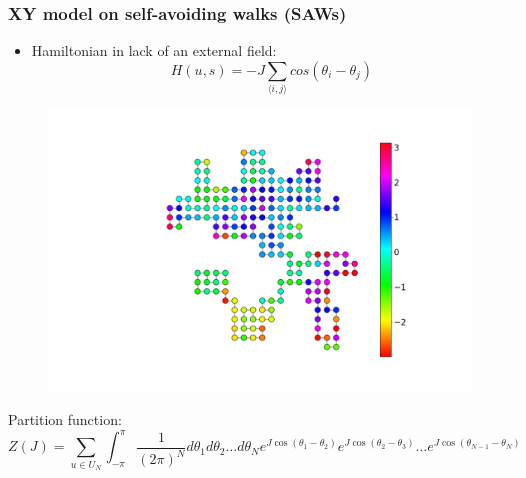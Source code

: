 \documentclass{beamer}
\begin{document}
\begin{frame}
\begin{multicols}{2}
 \end{multicols}
\end{frame}



\begin{frame}
	\frametitle{XY model on self-avoiding walks (SAWs)}
	\begin{multicols}{2}
		
		\begin{itemize}
			\item Hamiltonian in lack of an external field: 
			\begin{equation*}
			H(u,s) = -J \sum_{ \langle i, j \rangle } cos(\theta_i - \theta_j)  
			\end{equation*}
			
			
		\end{itemize}
		
		\columnbreak
		
		\begin{figure}[H]
			\centering
  	\includegraphics[scale=0.13]{state_example.png} 
			\label{fig:example}
		\end{figure}
		
	\end{multicols}

 Partition function:
\begin{equation*}
\label{partitionfunction}
Z(J) =  \sum_{u \in U_N }  \int_{-\pi}^{\pi}   \frac{1}{ (2 \pi  )^N}
d \theta_1 d \theta_2 \dots d\theta_N
e ^{J \cos(\theta_1-\theta_2)} e ^{J \cos(\theta_2-\theta_3)} \dots 
e ^{J \cos(\theta_{N-1}-\theta_N)} %
\end{equation*} 
\end{frame}
\end{document}
